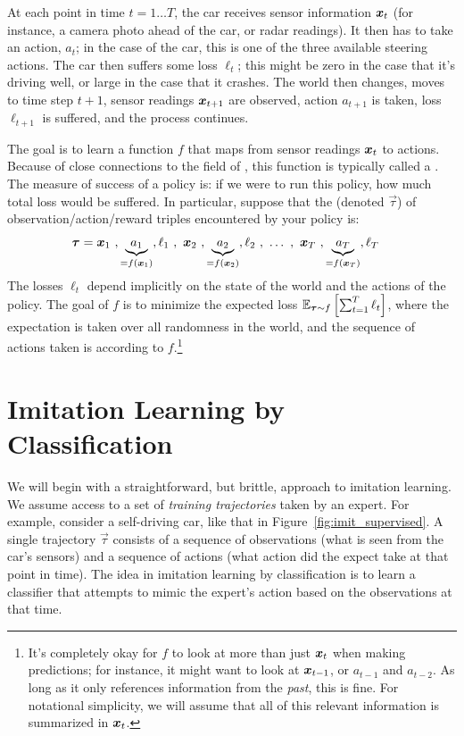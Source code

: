 At each point in time $t = 1 \dots T$, the car receives sensor information ${\boldsymbol{x}}_t$ (for instance, a camera photo ahead of the car, or radar readings).
It then has to take an action, $a_t$; in the case of the car, this is one of the three available steering actions.
The car then suffers some loss $\ell_t$; this might be zero in the case that it's driving well, or large in the case that it crashes.
The world then changes, moves to time step $t+1$, sensor readings ${\boldsymbol{x}}_{t+1}$ are observed, action $a_{t+1}$ is taken, loss $\ell_{t+1}$ is suffered, and the process continues.

The goal is to learn a function $f$ that maps from sensor readings ${\boldsymbol{x}}_t$ to actions.
Because of close connections to the field of , this function is typically called a .
The measure of success of a policy is: if we were to run this policy, how much total loss would be suffered.
In particular, suppose that the  (denoted $\vec\tau$) of observation/action/reward triples encountered by your policy is:
\begin{align}
  \boldsymbol{\tau} &=
  {\boldsymbol{x}}_1~, \underbrace{a_1}_{=f({\boldsymbol{x}}_1)}, \ell_1~,~
  {\boldsymbol{x}}_2~, \underbrace{a_2}_{=f({\boldsymbol{x}}_2)}, \ell_2~,~
  \dots~,~
  {\boldsymbol{x}}_T~, \underbrace{a_T}_{=f({\boldsymbol{x}}_T)}, \ell_T
\end{align}
The losses $\ell_t$ depend implicitly on the state of the world and the actions of the policy.
The goal of $f$ is to minimize the expected loss $\mathbb{E}_{\boldsymbol{\tau} \sim f}\left[ \sum_{t=1}^T \ell_t \right]$, where the expectation is taken over all randomness in the world, and the sequence of actions taken is according to $f$.\footnote{It's completely okay for $f$ to look at more than just ${\boldsymbol{x}}_t$ when making predictions; for instance, it might want to look at ${\boldsymbol{x}}_{t-1}$, or $a_{t-1}$ and $a_{t-2}$. As long as it only references information from the \emph{past}, this is fine. For notational simplicity, we will assume that all of this relevant information is summarized in ${\boldsymbol{x}}_t$.}

\section{Imitation Learning by Classification}

\newcommand{\vt}{\vec\tau}


We will begin with a straightforward, but brittle, approach to imitation learning.
We assume access to a set of \emph{training trajectories} taken by an expert.
For example, consider a self-driving car, like that in Figure~\ref{fig:imit_supervised}.
A single trajectory $\vt$ consists of a sequence of observations (what is seen from the car's sensors) and a sequence of actions (what action did the expect take at that point in time).
The idea in imitation learning by classification is to learn a classifier that attempts to mimic the expert's action based on the observations at that time.


